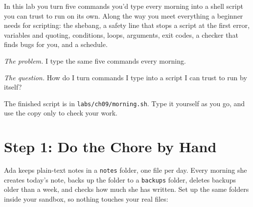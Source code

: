 
\begin{chapterintro}

In this lab you turn five commands you'd type every morning into a shell script you can trust to run on its own. Along the way you meet everything a beginner needs for scripting: the shebang, a safety line that stops a script at the first error, variables and quoting, conditions, loops, arguments, exit codes, a checker that finds bugs for you, and a schedule.

\end{chapterintro}

\emph{The problem.} I type the same five commands every morning.

\emph{The question.} How do I turn commands I type into a script I can trust to run by itself?

The finished script is in \texttt{labs/}\allowbreak{}\texttt{ch09/}\allowbreak{}\texttt{morning.sh}. Type it yourself as you go, and use the copy only to check your work.

\section{Step 1: Do the Chore by Hand}\label{09-lab-automate-a-daily-chore:step-1-do-the-chore-by-hand}

Ada keeps plain-text notes in a \texttt{notes} folder, one file per day. Every morning she creates today's note, backs up the folder to a \texttt{backups} folder, deletes backups older than a week, and checks how much she has written. Set up the same folders inside your sandbox, so nothing touches your real files:

\begin{codeblock}

\begin{Shaded}
\begin{Highlighting}[]
 
  \OperatorTok{\textgreater{}}
\end{Highlighting}
\end{Shaded}

\end{codeblock}

